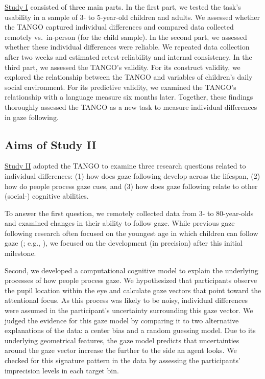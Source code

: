 \documentclass[
]{scrbook}
\begin{document}
\hyperref[studyI]{Study I} consisted of three main parts. In the first part, we tested the task's usability in a sample of 3- to 5-year-old children and adults. We assessed whether the TANGO captured individual differences and compared data collected remotely vs.~in-person (for the child sample). In the second part, we assessed whether these individual differences were reliable. We repeated data collection after two weeks and estimated retest-reliability and internal consistency. In the third part, we assessed the TANGO's validity. For its construct validity, we explored the relationship between the TANGO and variables of children's daily social environment. For its predictive validity, we examined the TANGO's relationship with a language measure six months later. Together, these findings thoroughly assessed the TANGO as a new task to measure individual differences in gaze following.

\subsection{Aims of Study II}\label{aims-of-study-ii}

\hyperref[studyII]{Study II} adopted the TANGO to examine three research questions related to individual differences: (1) how does gaze following develop across the lifespan, (2) how do people process gaze cues, and (3) how does gaze following relate to other (social-) cognitive abilities.

To answer the first question, we remotely collected data from 3- to 80-year-olds and examined changes in their ability to follow gaze. While previous gaze following research often focused on the youngest age in which children can follow gaze (; e.g., ), we focused on the development (in precision) after this initial milestone.

Second, we developed a computational cognitive model to explain the underlying processes of how people process gaze. We hypothesized that participants observe the pupil location within the eye and calculate gaze vectors that point toward the attentional focus. As this process was likely to be noisy, individual differences were assumed in the participant's uncertainty surrounding this gaze vector. We judged the evidence for this gaze model by comparing it to two alternative explanations of the data: a center bias and a random guessing model. Due to its underlying geometrical features, the gaze model predicts that uncertainties around the gaze vector increase the further to the side an agent looks. We checked for this signature pattern in the data by assessing the participants' imprecision levels in each target bin.
\end{document}
